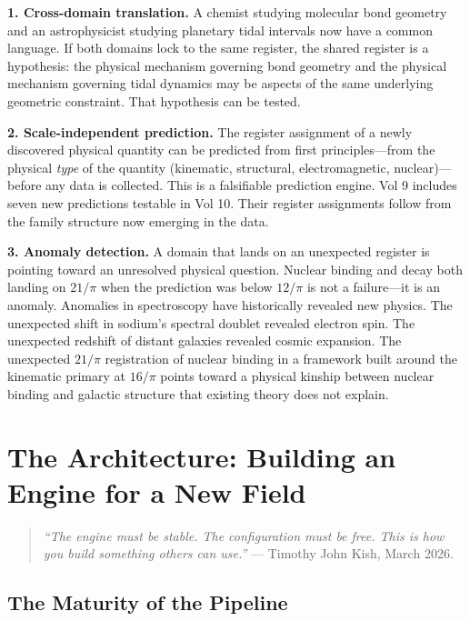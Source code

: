 \documentclass[11pt, letterpaper, openany]{book}
\begin{document}
\textbf{1. Cross-domain translation.} A chemist studying molecular bond geometry
and an astrophysicist studying planetary tidal intervals now have a common
language. If both domains lock to the same register, the shared register is a
hypothesis: the physical mechanism governing bond geometry and the physical
mechanism governing tidal dynamics may be aspects of the same underlying geometric
constraint. That hypothesis can be tested.

\textbf{2. Scale-independent prediction.} The register assignment of a newly
discovered physical quantity can be predicted from first principles---from the
physical \emph{type} of the quantity (kinematic, structural, electromagnetic,
nuclear)---before any data is collected. This is a falsifiable prediction engine.
Vol 9 includes seven new predictions testable in Vol 10. Their register assignments
follow from the family structure now emerging in the data.

\textbf{3. Anomaly detection.} A domain that lands on an unexpected register is
pointing toward an unresolved physical question. Nuclear binding and decay both
landing on $21/\pi$ when the prediction was below $12/\pi$ is not a failure---it
is an anomaly. Anomalies in spectroscopy have historically revealed new physics.
The unexpected shift in sodium's spectral doublet revealed electron spin. The
unexpected redshift of distant galaxies revealed cosmic expansion. The unexpected
$21/\pi$ registration of nuclear binding in a framework built around the
kinematic primary at $16/\pi$ points toward a physical kinship between nuclear
binding and galactic structure that existing theory does not explain.

\clearpage

\chapter{The Architecture: Building an Engine for a New Field}

\begin{quote}
\textit{``The engine must be stable. The configuration must be free. This is how
you build something others can use.''} --- Timothy John Kish, March 2026.
\end{quote}

\section{The Maturity of the Pipeline}
\end{document}
